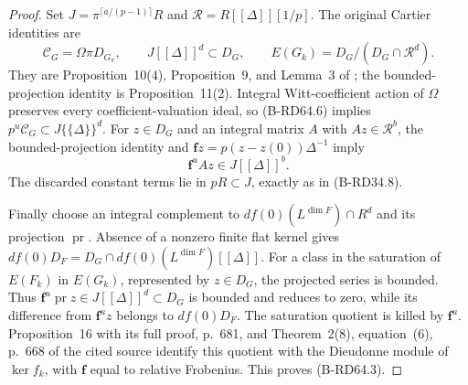 \begin{proof}
Set $J=\pi^{\lceil a/(p-1)\rceil}R$ and
$\mathcal R=R[[\Delta]][1/p]$. The original Cartier identities are
\[
 \mathcal C_G=\Omega\pi D_{G_\pi},\qquad
 J[[\Delta]]^d\subset D_G,\qquad
 E(G_k)=D_G/(D_G\cap\mathcal R^d).
\]
They are Proposition~10(4), Proposition~9, and Lemma~3 of
\cite[pp.~674--676]{Bondarko2006Generic}; the bounded-projection
identity is Proposition~11(2). Integral Witt-coefficient action
of $\Omega$ preserves every coefficient-valuation ideal, so
(B-RD64.6) implies $p^u\mathcal C_G\subset J\{\{\Delta\}\}^d$.
For $z\in D_G$ and an integral matrix $A$ with $Az\in\mathcal R^b$,
the bounded-projection identity and
$\mathbf fz=p(z-z(0))\Delta^{-1}$ imply
\[
                         \mathbf f^uAz\in J[[\Delta]]^b.
\]
The discarded constant terms lie in $pR\subset J$, exactly as
in (B-RD34.8).

Finally choose an integral complement to
$df(0)(L^{\dim F})\cap R^d$ and its projection $\operatorname{pr}$.
Absence of a nonzero finite flat kernel gives
$df(0)D_F=D_G\cap df(0)(L^{\dim F})[[\Delta]]$.
For a class in the saturation of $E(F_k)$ in $E(G_k)$,
represented by $z\in D_G$, the projected series is bounded.
Thus $\mathbf f^u\operatorname{pr}z\in J[[\Delta]]^d\subset D_G$
is bounded and reduces to zero, while its difference from
$\mathbf f^uz$ belongs to $df(0)D_F$.
The saturation quotient is killed by $\mathbf f^u$.
Proposition~16 with its full proof, p.~681, and Theorem~2(8),
equation~(6), p.~668 of the cited source identify this quotient
with the Dieudonne module of $\ker f_k$, with $\mathbf f$
equal to relative Frobenius. This proves (B-RD64.3).
\end{proof}


